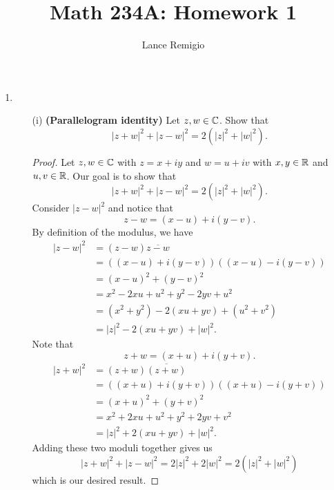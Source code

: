\documentclass[a4paper]{article}
\title{Math 234A: Homework 1}
\author{Lance Remigio}
\begin{document}
   \maketitle 

\begin{enumerate}
    \item  
        \begin{enumerate}
            \item[(i)] \textbf{(Parallelogram identity)} Let \( z,w \in \mathbb{C}  \). Show that 
                \[  | z + w  |^{2} + | z - w  |^{2} = 2 (| z  |^{2} + | w |^{2}).  \]
                \begin{proof}
                Let \( z,w \in \mathbb{C}  \) with \( z = x + iy  \) and \( w = u + iv  \) with \( x,y \in \mathbb{R}  \) and \( u,v \in \mathbb{R}  \). Our goal is to show that  
                \[   | z + w  |^{2} + | z - w  |^{2} = 2 (| z  |^{2} + | w |^{2}).    \]
                Consider \( | z - w  |^{2} \) and notice that 
                \[  z - w = (x - u) + i(y - v). \]
                By definition of the modulus, we have 
                \begin{align*}
                    | z - w  |^{2} &= (z - w) \overline{z - w} \\
                                   &= ((x-u) + i(y-v))((x-u) - i(y -v)) \\
                                   &= (x - u)^{2} + (y -v)^{2} \\
                                   &= x^{2} - 2xu + u^{2} + y^{2} - 2yv + u^{2} \\
                                   &= (x^{2} + y^{2}) - 2(xu + yv) + (u^{2} + v^{2}) \\
                                   &= | z |^{2} - 2(xu + yv) + | w |^{2}.
                \end{align*}
                Note that 
                \[  z + w = (x+u) + i(y+v). \]
                \begin{align*}
                    | z + w  |^{2} &= (z + w) \overline{(z+w)}   \\
                                   &= ((x+u) + i(y+v))((x+u) - i(y+v)) \\
                                   &= (x+u)^{2} + (y +v)^{2} \\
                                   &= x^{2} + 2xu + u^{2} + y^{2} + 2yv + v^{2} \\ 
                                   &= | z |^{2} + 2(xu + yv) + | w  |^{2}.
                \end{align*}
                Adding these two moduli together gives us
                \[ | z + w  |^{2} + | z - w  |^{2} = 2 | z  |^{2} + 2 | w |^{2} = 2 (| z | ^{2} + | w |^{2})    \]
                which is our desired result.


\end{proof}
\end{enumerate}
\end{enumerate}
\end{document}
